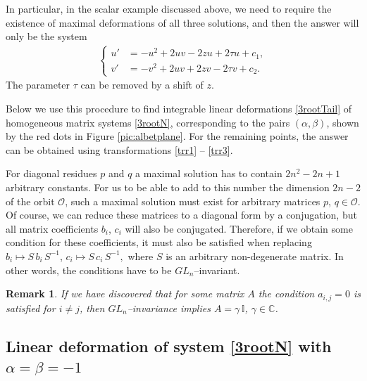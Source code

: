 \documentclass{article}
\theoremstyle{plain}
\newtheorem{remark}{Remark}
\begin{document}
In particular, in the scalar example discussed above, we need to require the existence of maximal deformations of all three solutions, and then the answer will only be the system 
\begin{gather}\label{sysshift}
    \begin{cases}
    u'
    &= - u^2 
    + 2 u v - 2 z u
    + 2 \tau u
    + c_1
    ,
    \\[2mm]
    v'
    &= - v^2 + 2 u v + 2 z v
    - 2 \tau v
    + c_2
    .
    \end{cases}
\end{gather}
The parameter $\tau$ can be removed by a shift of $z$.

Below we use this procedure to find integrable linear deformations \eqref{3rootTail} of homogeneous matrix systems \eqref{3rootN}, corresponding to the pairs $(\alpha, \beta)$, shown by the red dots in Figure \ref{pic:albetplane}. For the remaining points, the answer can be obtained using transformations \eqref{trr1} -- \eqref{trr3}.

For diagonal residues $p$ and $q$ a maximal solution has to contain $2 n^2 - 2 n + 1$ arbitrary constants. For us to be able to add to this number the dimension $2 n - 2$ of the orbit ${\mathcal O}$, such a maximal solution must exist for arbitrary matrices $p$, $q \in {\mathcal O}$. Of course, we can reduce these matrices to a diagonal form by a conjugation, but all matrix coefficients $b_i$, $c_i$ will also be conjugated. Therefore, if we obtain some condition for these coefficients, it must also be satisfied when replacing $b_i \mapsto S \, b_i \, S^{-1}$, $c_i \mapsto S \, c_i \, S^{-1},$ where $S$ is an arbitrary non-degenerate matrix. In other words, the conditions have to be $GL_n$--invariant.
 
\begin{remark} \label{invariance}
If we have discovered that for some matrix $A$ the condition $a_{i,j} = 0$ is satisfied for $i \ne j$, then $GL_n$--invariance implies $A = \gamma\, \mathbb{I}$, $\gamma \in \mathbb{C}$.
\end{remark}

\subsection{Linear deformation of system \eqref{3rootN} with \texorpdfstring{$\alpha = \beta =-1$}{alpha = beta = -1}}
\end{document}
